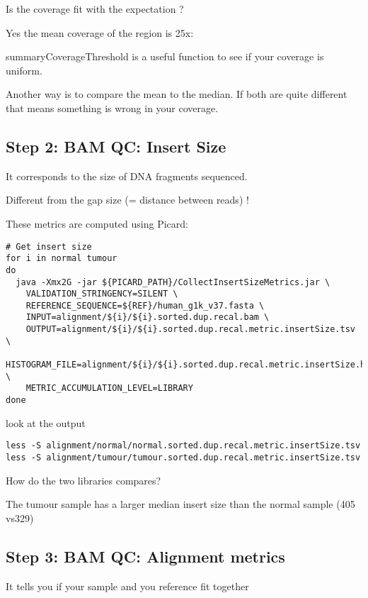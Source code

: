 \begin{question}
Is the coverage fit with the expectation ?
\end{question}
\begin{answer}
Yes the mean coverage of the region is 25x:

summaryCoverageThreshold is a useful function to see if your coverage is uniform.
 
Another way is to compare the mean to the median. If both are quite different that means something is wrong in your coverage.
\end{answer}

\subsection{Step 2: BAM QC: Insert Size}
It corresponds to the size of DNA fragments sequenced.

Different from the gap size (= distance between reads) !

These metrics are computed using Picard:

\begin{lstlisting}
# Get insert size
for i in normal tumour
do
  java -Xmx2G -jar ${PICARD_PATH}/CollectInsertSizeMetrics.jar \
    VALIDATION_STRINGENCY=SILENT \
    REFERENCE_SEQUENCE=${REF}/human_g1k_v37.fasta \
    INPUT=alignment/${i}/${i}.sorted.dup.recal.bam \
    OUTPUT=alignment/${i}/${i}.sorted.dup.recal.metric.insertSize.tsv \
    HISTOGRAM_FILE=alignment/${i}/${i}.sorted.dup.recal.metric.insertSize.histo.pdf \
    METRIC_ACCUMULATION_LEVEL=LIBRARY
done
\end{lstlisting}

look at the output

\begin{lstlisting}
less -S alignment/normal/normal.sorted.dup.recal.metric.insertSize.tsv
less -S alignment/tumour/tumour.sorted.dup.recal.metric.insertSize.tsv
\end{lstlisting}

\begin{question}
How do the two libraries compares? 
\end{question}
\begin{answer}
The tumour sample has a larger median insert size than the normal sample (405 vs329) 
\end{answer}

\subsection{Step 3: BAM QC: Alignment metrics}
It tells you if your sample and you reference fit together

